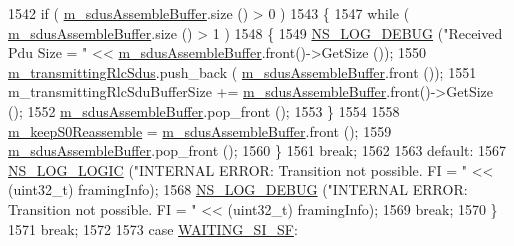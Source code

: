\begin{DoxyCode}
1542                               \textcolor{keywordflow}{if} ( \hyperlink{classns3_1_1LteRlcAm_a075262ee7d8d49e97ab0c48b5e763bf1}{m\_sdusAssembleBuffer}.size () > 0 )
1543                                 \{
1547                                   \textcolor{keywordflow}{while} ( \hyperlink{classns3_1_1LteRlcAm_a075262ee7d8d49e97ab0c48b5e763bf1}{m\_sdusAssembleBuffer}.size () > 1 )
1548                                     \{
1549                                       \hyperlink{group__logging_ga413f1886406d49f59a6a0a89b77b4d0a}{NS\_LOG\_DEBUG} (\textcolor{stringliteral}{"Received Pdu Size = "} << 
      \hyperlink{classns3_1_1LteRlcAm_a075262ee7d8d49e97ab0c48b5e763bf1}{m\_sdusAssembleBuffer}.front()->GetSize ());
1550                                       \hyperlink{classns3_1_1LteRlcAm_a941fac42e27a28f35b0eea1a02c0595f}{m\_transmittingRlcSdus}.push\_back (
      \hyperlink{classns3_1_1LteRlcAm_a075262ee7d8d49e97ab0c48b5e763bf1}{m\_sdusAssembleBuffer}.front ());
1551                                       m\_transmittingRlcSduBufferSize += 
      \hyperlink{classns3_1_1LteRlcAm_a075262ee7d8d49e97ab0c48b5e763bf1}{m\_sdusAssembleBuffer}.front()->GetSize ();
1552                                       \hyperlink{classns3_1_1LteRlcAm_a075262ee7d8d49e97ab0c48b5e763bf1}{m\_sdusAssembleBuffer}.pop\_front ();
1553                                     \}
1554 
1558                                   \hyperlink{classns3_1_1LteRlcAm_ab3240ea3468d9b515fc38e717273d3bd}{m\_keepS0Reassemble} = 
      \hyperlink{classns3_1_1LteRlcAm_a075262ee7d8d49e97ab0c48b5e763bf1}{m\_sdusAssembleBuffer}.front ();
1559                                   \hyperlink{classns3_1_1LteRlcAm_a075262ee7d8d49e97ab0c48b5e763bf1}{m\_sdusAssembleBuffer}.pop\_front ();
1560                                 \}
1561                       \textcolor{keywordflow}{break};
1562 
1563                       \textcolor{keywordflow}{default}:
1567                               \hyperlink{group__logging_ga88acd260151caf2db9c0fc84997f45ce}{NS\_LOG\_LOGIC} (\textcolor{stringliteral}{"INTERNAL ERROR: Transition not possible. FI = "} <<
       (uint32\_t) framingInfo);
1568                               \hyperlink{group__logging_ga413f1886406d49f59a6a0a89b77b4d0a}{NS\_LOG\_DEBUG} (\textcolor{stringliteral}{"INTERNAL ERROR: Transition not possible. FI = "} <<
       (uint32\_t) framingInfo);
1569                       \textcolor{keywordflow}{break};
1570                     \}
1571           \textcolor{keywordflow}{break};
1572 
1573           \textcolor{keywordflow}{case} \hyperlink{classns3_1_1LteRlcAm_a43eeebdccf778e2247c956481ed03d62a967f9c81a213f824b6a908bdfc1a7e4e}{WAITING\_SI\_SF}:

\end{DoxyCode}
